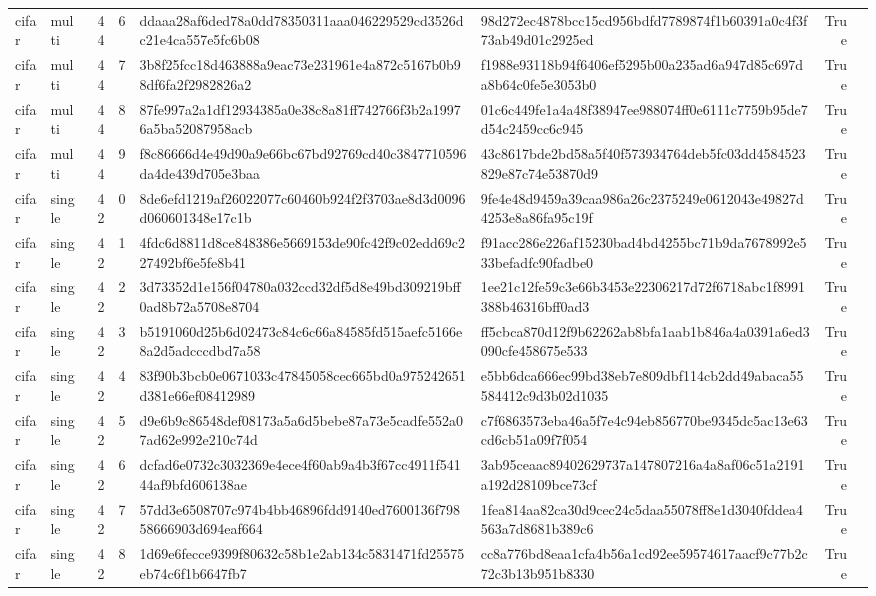 \begin{tabular}{llrrllrl}
cifar & multi & 44 & 6 & ddaaa28af6ded78a0dd78350311aaa046229529cd3526dc21e4ca557e5fc6b08 & 98d272ec4878bcc15cd956bdfd7789874f1b60391a0c4f3f73ab49d01c2925ed & True &  \\
cifar & multi & 44 & 7 & 3b8f25fcc18d463888a9eac73e231961e4a872c5167b0b98df6fa2f2982826a2 & f1988e93118b94f6406ef5295b00a235ad6a947d85c697da8b64c0fe5e3053b0 & True &  \\
cifar & multi & 44 & 8 & 87fe997a2a1df12934385a0e38c8a81ff742766f3b2a19976a5ba52087958acb & 01c6c449fe1a4a48f38947ee988074ff0e6111c7759b95de7d54c2459cc6c945 & True &  \\
cifar & multi & 44 & 9 & f8c86666d4e49d90a9e66bc67bd92769cd40c3847710596da4de439d705e3baa & 43c8617bde2bd58a5f40f573934764deb5fc03dd4584523829e87c74e53870d9 & True &  \\
cifar & single & 42 & 0 & 8de6efd1219af26022077c60460b924f2f3703ae8d3d0096d060601348e17c1b & 9fe4e48d9459a39caa986a26c2375249e0612043e49827d4253e8a86fa95c19f & True &  \\
cifar & single & 42 & 1 & 4fdc6d8811d8ce848386e5669153de90fc42f9c02edd69c227492bf6e5fe8b41 & f91acc286e226af15230bad4bd4255bc71b9da7678992e533befadfc90fadbe0 & True &  \\
cifar & single & 42 & 2 & 3d73352d1e156f04780a032ccd32df5d8e49bd309219bff0ad8b72a5708e8704 & 1ee21c12fe59c3e66b3453e22306217d72f6718abc1f8991388b46316bff0ad3 & True &  \\
cifar & single & 42 & 3 & b5191060d25b6d02473c84c6c66a84585fd515aefc5166e8a2d5adcccdbd7a58 & ff5cbca870d12f9b62262ab8bfa1aab1b846a4a0391a6ed3090cfe458675e533 & True &  \\
cifar & single & 42 & 4 & 83f90b3bcb0e0671033c47845058cec665bd0a975242651d381e66ef08412989 & e5bb6dca666ec99bd38eb7e809dbf114cb2dd49abaca55584412c9d3b02d1035 & True &  \\
cifar & single & 42 & 5 & d9e6b9c86548def08173a5a6d5bebe87a73e5cadfe552a07ad62e992e210c74d & c7f6863573eba46a5f7e4c94eb856770be9345dc5ac13e63cd6cb51a09f7f054 & True &  \\
cifar & single & 42 & 6 & dcfad6e0732c3032369e4ece4f60ab9a4b3f67cc4911f54144af9bfd606138ae & 3ab95ceaac89402629737a147807216a4a8af06c51a2191a192d28109bce73cf & True &  \\
cifar & single & 42 & 7 & 57dd3e6508707c974b4bb46896fdd9140ed7600136f79858666903d694eaf664 & 1fea814aa82ca30d9cec24c5daa55078ff8e1d3040fddea4563a7d8681b389c6 & True &  \\
cifar & single & 42 & 8 & 1d69e6fecce9399f80632c58b1e2ab134c5831471fd25575eb74c6f1b6647fb7 & cc8a776bd8eaa1cfa4b56a1cd92ee59574617aacf9c77b2c72c3b13b951b8330 & True &  \\

\end{tabular}
